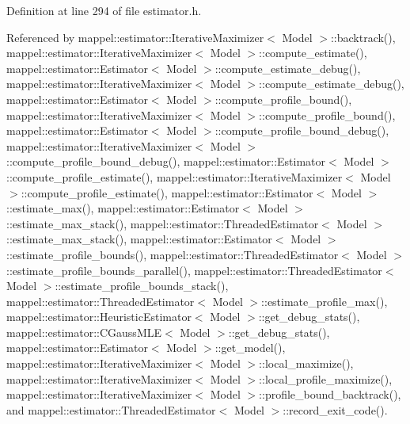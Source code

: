 Definition at line 294 of file estimator.\+h.



Referenced by mappel\+::estimator\+::\+Iterative\+Maximizer$<$ Model $>$\+::backtrack(), mappel\+::estimator\+::\+Iterative\+Maximizer$<$ Model $>$\+::compute\+\_\+estimate(), mappel\+::estimator\+::\+Estimator$<$ Model $>$\+::compute\+\_\+estimate\+\_\+debug(), mappel\+::estimator\+::\+Iterative\+Maximizer$<$ Model $>$\+::compute\+\_\+estimate\+\_\+debug(), mappel\+::estimator\+::\+Estimator$<$ Model $>$\+::compute\+\_\+profile\+\_\+bound(), mappel\+::estimator\+::\+Iterative\+Maximizer$<$ Model $>$\+::compute\+\_\+profile\+\_\+bound(), mappel\+::estimator\+::\+Estimator$<$ Model $>$\+::compute\+\_\+profile\+\_\+bound\+\_\+debug(), mappel\+::estimator\+::\+Iterative\+Maximizer$<$ Model $>$\+::compute\+\_\+profile\+\_\+bound\+\_\+debug(), mappel\+::estimator\+::\+Estimator$<$ Model $>$\+::compute\+\_\+profile\+\_\+estimate(), mappel\+::estimator\+::\+Iterative\+Maximizer$<$ Model $>$\+::compute\+\_\+profile\+\_\+estimate(), mappel\+::estimator\+::\+Estimator$<$ Model $>$\+::estimate\+\_\+max(), mappel\+::estimator\+::\+Estimator$<$ Model $>$\+::estimate\+\_\+max\+\_\+stack(), mappel\+::estimator\+::\+Threaded\+Estimator$<$ Model $>$\+::estimate\+\_\+max\+\_\+stack(), mappel\+::estimator\+::\+Estimator$<$ Model $>$\+::estimate\+\_\+profile\+\_\+bounds(), mappel\+::estimator\+::\+Threaded\+Estimator$<$ Model $>$\+::estimate\+\_\+profile\+\_\+bounds\+\_\+parallel(), mappel\+::estimator\+::\+Threaded\+Estimator$<$ Model $>$\+::estimate\+\_\+profile\+\_\+bounds\+\_\+stack(), mappel\+::estimator\+::\+Threaded\+Estimator$<$ Model $>$\+::estimate\+\_\+profile\+\_\+max(), mappel\+::estimator\+::\+Heuristic\+Estimator$<$ Model $>$\+::get\+\_\+debug\+\_\+stats(), mappel\+::estimator\+::\+C\+Gauss\+M\+L\+E$<$ Model $>$\+::get\+\_\+debug\+\_\+stats(), mappel\+::estimator\+::\+Estimator$<$ Model $>$\+::get\+\_\+model(), mappel\+::estimator\+::\+Iterative\+Maximizer$<$ Model $>$\+::local\+\_\+maximize(), mappel\+::estimator\+::\+Iterative\+Maximizer$<$ Model $>$\+::local\+\_\+profile\+\_\+maximize(), mappel\+::estimator\+::\+Iterative\+Maximizer$<$ Model $>$\+::profile\+\_\+bound\+\_\+backtrack(), and mappel\+::estimator\+::\+Threaded\+Estimator$<$ Model $>$\+::record\+\_\+exit\+\_\+code().

